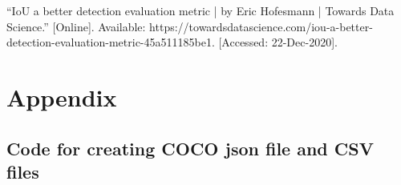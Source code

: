 \documentclass[12pt]{report}
\begin{document}
\begin{thebibliography}{1}
“IoU a better detection evaluation metric | by Eric Hofesmann | Towards Data Science.” [Online]. Available: https://towardsdatascience.com/iou-a-better-detection-evaluation-metric-45a511185be1. [Accessed: 22-Dec-2020].



\end{thebibliography}






\appendix

\chapter{Appendix}
\section{Code for creating COCO json file and CSV files}
\end{document}

